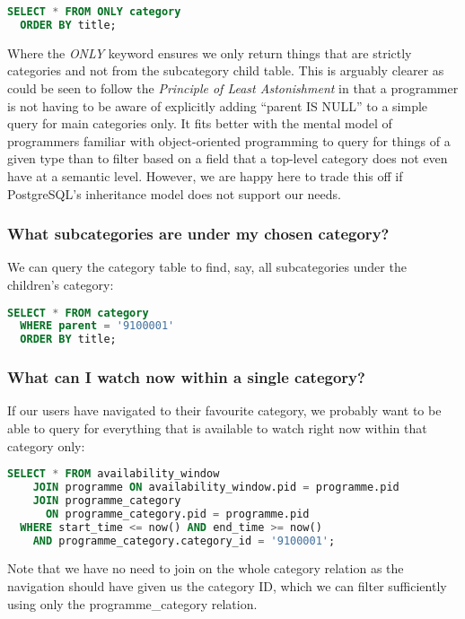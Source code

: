 \documentclass[11pt,a4paper]{article}
\begin{document}
\begin{lstlisting}[language=SQL]
  SELECT * FROM ONLY category
  ORDER BY title;
\end{lstlisting}

Where the \emph{ONLY} keyword ensures we only return things that
are strictly categories and not from the subcategory child table.
This is arguably clearer as could be seen to follow the
\emph{Principle of Least Astonishment}
\cite{saltzer2009principles}
in that a programmer
is not having to be aware of explicitly adding ``parent IS NULL''
to a simple query for main categories only. It fits better with
the mental model of programmers familiar with object-oriented
programming to query for things of a given type than to filter
based on a field that a top-level category does not even have
at a semantic level. However, we are happy here to trade this
off if PostgreSQL's inheritance model does not support our needs.

\subsubsection{What subcategories are under my chosen category?}

We can query the category table to find, say, all subcategories under
the children's category:

\begin{lstlisting}[language=SQL]
  SELECT * FROM category
  WHERE parent = '9100001'
  ORDER BY title;
\end{lstlisting}

\subsubsection{What can I watch now within a single category?}

If our users have navigated to their favourite category, we probably want
to be able to query for everything that is available to watch right
now within that category only:

\begin{lstlisting}[language=SQL]
  SELECT * FROM availability_window
    JOIN programme ON availability_window.pid = programme.pid
    JOIN programme_category
      ON programme_category.pid = programme.pid
  WHERE start_time <= now() AND end_time >= now()
    AND programme_category.category_id = '9100001';
\end{lstlisting}

Note that we have no need to join on the whole category relation as the
navigation should have given us the category ID, which we can filter
sufficiently using only the programme\_category relation.
\end{document}
